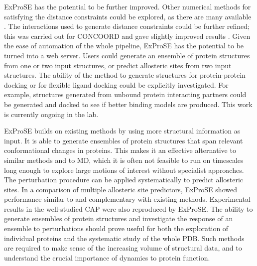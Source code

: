 ExProSE has the potential to be further improved.
Other numerical methods for satisfying the distance constraints could be explored, as there are many available \cite{DeBakker2006}.
The interactions used to generate distance constraints could be further refined; this was carried out for CONCOORD and gave slightly improved results \cite{DeGroot1999}.
Given the ease of automation of the whole pipeline, ExProSE has the potential to be turned into a web server.
Users could generate an ensemble of protein structures from one or two input structures, or predict allosteric sites from two input structures.
The ability of the method to generate structures for protein-protein docking or for flexible ligand docking could be explicitly investigated.
For example, structures generated from unbound protein interacting partners could be generated and docked to see if better binding models are produced.
This work is currently ongoing in the lab.

ExProSE builds on existing methods by using more structural information as input.
It is able to generate ensembles of protein structures that span relevant conformational changes in proteins.
This makes it an effective alternative to similar methods and to MD, which it is often not feasible to run on timescales long enough to explore large motions of interest without specialist approaches.
The perturbation procedure can be applied systematically to predict allosteric sites.
In a comparison of multiple allosteric site predictors, ExProSE showed performance similar to and complementary with existing methods.
Experimental results in the well-studied CAP were also reproduced by ExProSE.
The ability to generate ensembles of protein structures and investigate the response of an ensemble to perturbations should prove useful for both the exploration of individual proteins and the systematic study of the whole PDB.
Such methods are required to make sense of the increasing volume of structural data, and to understand the crucial importance of dynamics to protein function.
